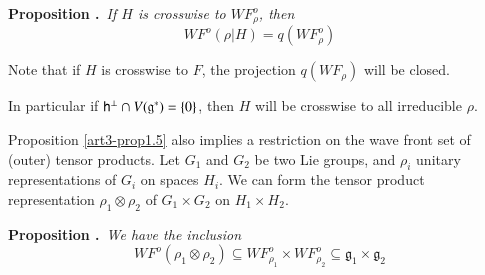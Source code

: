 \medskip
\noindent
{\bf Proposition .\label{art3-prop1.6}}~{\em If $H$ is crosswise to $WF^{o}_{\rho}$, then}
\begin{equation*}
WF^{o}(\rho|H)=q(WF^{o}_{\rho})\tag{1.23}\label{art3-eq1.23}
\end{equation*}

Note that if $H$ is crosswise to $F$, the projection $q(WF_{\rho})$ will be closed.

In particular if $\mathsf{h}^{\perp}\cap V(\mathfrak{g}^{*})=\{0\}$, then $H$ will be crosswise to all irreducible $\rho$.

Proposition \ref{art3-prop1.5} also implies a restriction on the wave front set of (outer) tensor products. Let $G_{1}$ and $G_{2}$ be two Lie groups, and $\rho_{i}$ unitary representations of $G_{i}$ on spaces $H_{i}$. We can form the tensor product representation $\rho_{1}\otimes \rho_{2}$ of $G_{1}\times G_{2}$ on $H_{1}\times H_{2}$.

\medskip
\noindent
{\bf Proposition .\label{art3-prop1.7}}~{\em We have the inclusion}
\begin{equation*}
WF^{o}(\rho_{1}\otimes \rho_{2})\subseteq WF^{o}_{\rho_{1}}\times WF^{o}_{\rho_{2}}\subseteq \mathfrak{g}_{1}\times \mathfrak{g}_{2}\tag{1.24}\label{art3-eq1.24}
\end{equation*}

